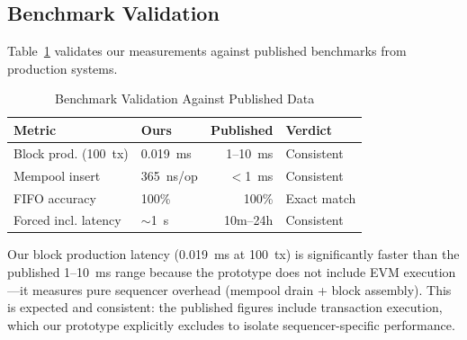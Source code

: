 \subsection{Benchmark Validation}

Table~\ref{tab:benchmark-validation} validates our measurements against published
benchmarks from production systems.

\begin{table}[htbp]
\caption{Benchmark Validation Against Published Data}
\label{tab:benchmark-validation}
\centering
\begin{tabular}{llrl}
\toprule
\textbf{Metric} & \textbf{Ours} & \textbf{Published} & \textbf{Verdict} \\
\midrule
Block prod. (100~tx) & 0.019~ms & 1--10~ms & Consistent \\
Mempool insert & 365~ns/op & $<$1~ms & Consistent \\
FIFO accuracy & 100\% & 100\% & Exact match \\
Forced incl. latency & ${\sim}$1~s & 10m--24h & Consistent \\
\bottomrule
\end{tabular}
\end{table}

Our block production latency (0.019~ms at 100~tx) is significantly faster than the
published 1--10~ms range because the prototype does not include EVM execution---it
measures pure sequencer overhead (mempool drain + block assembly). This is expected
and consistent: the published figures include transaction execution, which our
prototype explicitly excludes to isolate sequencer-specific performance.

